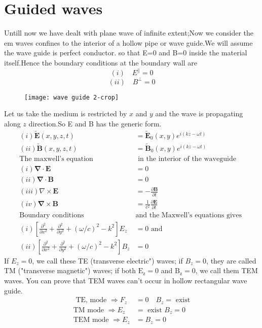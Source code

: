 \section{Guided waves}
Untill now we have dealt with plane wave of infinite extent;Now we consider the em waves confines to the interior of a hollow pipe or wave guide.We will assume the wave guide is perfect conductor. so that E=0 and B=0 inside the material itself.Hence the boundary conditions at the boundary wall are\\
$$ (i) \quad  E^{\parallel}=0$$ 
$$ (ii) \quad B^{\perp}=0$$
\begin{figure}[H]
	\centering
	\texttt{[image: wave guide 2-crop]}
	\caption{}
	\label{}
\end{figure}
Let us take the medium is restricted by $x$ and $y$ and the wave is propagating along $z$ direction.So E and B has the generic form.
\begin{align*}
(i) \tilde{\mathbf{E}}(x, y, z, t)&=\tilde{\mathbf{E}}_{0}(x, y) e^{i(k z-\omega t)}\\
(ii) \tilde{\mathbf{B}}(x, y, z, t)&=\tilde{\mathbf{B}}_{0}(x, y) e^{i(k z-\omega t)}\\
\text{The maxwell's equation}&\text{ in the interior of the waveguide}\\
(i) \boldsymbol{\nabla} \cdot \mathbf{E}&=0\\
(ii)\boldsymbol{\nabla} \cdot \mathbf{B}&=0\\
(iii) \nabla \times \mathbf{E}&=-\frac{\partial \mathbf{B}}{\partial t}\\
(iv) \boldsymbol{\nabla} \times \mathbf{B}&=\frac{1}{c^{2}} \frac{\partial \mathbf{E}}{\partial t}\\
\text{Boundary conditions }&\text{and the Maxwell's equations gives }\\
 (i) \left[\frac{\partial^{2}}{\partial x^{2}}+\frac{\partial^{2}}{\partial y^{2}}+(\omega / c)^{2}-k^{2}\right] E_{z}&=0\text{ and}\\
(ii) \left[\frac{\partial^{2}}{\partial x^{2}}+\frac{\partial^{2}}{\partial y^{2}}+(\omega / c)^{2}-k^{2}\right] B_{z}&=0
\end{align*}
If $E_{z}=0$, we call these TE (transverse electric") waves; if $B_{z}=0$, they are called TM ("transverse magnetic") waves; if both $\mathrm{E}_{\mathrm{z}}=0$ and $\mathrm{B}_{\mathrm{z}}=0$, we call them TEM waves. You can prove that TEM waves can't occur in hollow rectangular wave guide.
\begin{align*}
\text{ TE, mode }\Rightarrow F_{z}&=0 \quad B_{z}=\text{ exist}\\
\mathrm{TM}\text{ mode }\Rightarrow E_{z}&=\text{ exist }B_{z}=0\\
\text{TEM mode }\Rightarrow E_{z}&=B_{z}=0
\end{align*}
